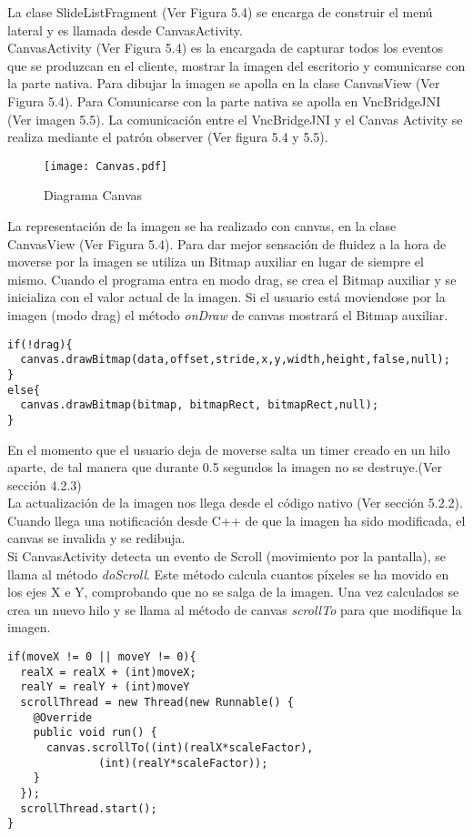 La clase SlideListFragment (Ver Figura 5.4) se encarga de construir el menú lateral y es llamada desde CanvasActivity.\\

CanvasActivity (Ver Figura 5.4) es la encargada de capturar todos los eventos que se produzcan en el cliente, mostrar la imagen del escritorio y comunicarse con la parte nativa. Para dibujar la imagen se apolla en la clase CanvasView (Ver Figura 5.4). Para Comunicarse con la parte nativa se apolla en VncBridgeJNI (Ver imagen 5.5). La comunicación entre el VncBridgeJNI y el Canvas Activity se realiza mediante el patrón observer (Ver figura 5.4 y 5.5).\\

\begin{figure}[h]
\begin{center}
\texttt{[image: Canvas.pdf]}
\end{center}
\caption{Diagrama Canvas}
\end{figure}

La representación de la imagen se ha realizado con canvas, en la clase CanvasView (Ver Figura 5.4). Para dar mejor sensación de fluidez a la hora de moverse por la imagen se utiliza un Bitmap auxiliar en lugar de siempre el mismo. Cuando el programa entra en modo drag, se crea el Bitmap auxiliar y se inicializa con el valor actual de la imagen. Si el usuario está moviendose por la imagen (modo drag) el método \emph{onDraw} de canvas mostrará el Bitmap auxiliar.
\begin{lstlisting}
if(!drag){	
  canvas.drawBitmap(data,offset,stride,x,y,width,height,false,null);
}
else{
  canvas.drawBitmap(bitmap, bitmapRect, bitmapRect,null);
}
\end{lstlisting}
\newpage
En el momento que el usuario deja de moverse salta un timer creado en un hilo aparte, de tal manera que durante 0.5 segundos la imagen no se destruye.(Ver sección 4.2.3)\\

La actualización de la imagen nos llega desde el código nativo (Ver sección 5.2.2). Cuando llega una notificación desde C++ de que la imagen ha sido modificada, el canvas se invalida y se redibuja.\\

Si CanvasActivity detecta un evento de Scroll (movimiento por la pantalla), se llama al método \emph{doScroll}. Este método calcula cuantos píxeles se ha movido en los ejes X e Y, comprobando que no se salga de la imagen. Una vez calculados se crea un nuevo hilo y se llama al método de canvas \emph{scrollTo} para que modifique la imagen.
\begin{lstlisting}
if(moveX != 0 || moveY != 0){
  realX = realX + (int)moveX;
  realY = realY + (int)moveY
  scrollThread = new Thread(new Runnable() {
    @Override
    public void run() {
      canvas.scrollTo((int)(realX*scaleFactor),
		      (int)(realY*scaleFactor));
    }
  });
  scrollThread.start();
}
\end{lstlisting}

